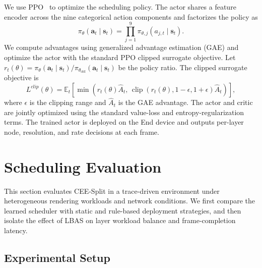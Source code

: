 \documentclass[10pt,journal,compsoc]{IEEEtran}
\begin{document}
We use PPO~\cite{schulman_proximal_2017} to optimize the scheduling policy. The actor shares a feature encoder across the nine categorical action components and factorizes the policy as
\begin{equation}
	\pi_{\theta}(\mathbf{a}_t\mid\mathbf{s}_t)
	=\prod_{j=1}^{9}\pi_{\theta,j}(a_{j,t}\mid\mathbf{s}_t).
	\label{eq:factorized_policy}
\end{equation}
We compute advantages using generalized advantage estimation (GAE) and optimize the actor with the standard PPO clipped surrogate objective. Let $r_t(\theta)=\pi_{\theta}(\mathbf{a}_t\mid\mathbf{s}_t)/ \pi_{\theta_{\mathrm{old}}}(\mathbf{a}_t\mid\mathbf{s}_t)$ be the policy ratio. The clipped surrogate objective is
\begin{equation}
	L^{clip}(\theta)=\mathbb{E}_t\!\left[
	\min\!\left(r_t(\theta)\widehat A_t,\,
	\operatorname{clip}(r_t(\theta),1-\epsilon,1+\epsilon)\widehat A_t\right)
	\right],
	\label{eq:ppo_clip}
\end{equation}
where $\epsilon$ is the clipping range and $\widehat A_t$ is the GAE advantage. The actor and critic are jointly optimized using the standard value-loss and entropy-regularization terms. The trained actor is deployed on the End device and outputs per-layer node, resolution, and rate decisions at each frame.

\section{Scheduling Evaluation}
\label{sec:control_plane}

This section evaluates CEE-Split in a trace-driven environment under heterogeneous rendering workloads and network conditions. We first compare the learned scheduler with static and rule-based deployment strategies, and then isolate the effect of LBAS on layer workload balance and frame-completion latency.

\subsection{Experimental Setup}
\label{sec:training_setup}
\end{document}

